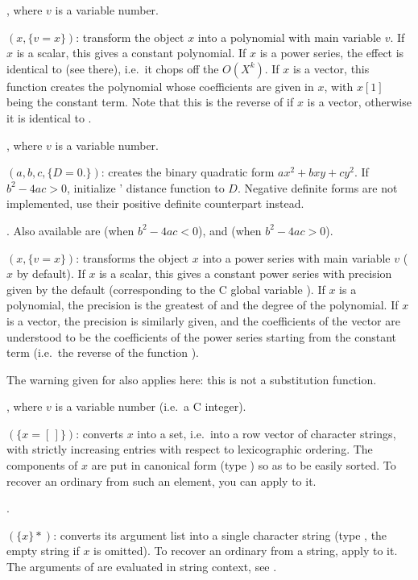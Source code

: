 , where $v$ is a variable number.

$(x,\{v=x\})$: transform the object $x$ into a polynomial
with main variable $v$. If $x$ is a scalar, this gives a constant polynomial.
If $x$ is a power series, the effect is identical to  (see
there), i.e.~it chops off the $O(X^k)$. If $x$ is a vector, this function
creates the polynomial whose coefficients are given in $x$, with $x[1]$ being
the constant term. Note that this is the reverse of  if $x$ is a
vector, otherwise it is identical to .

, where $v$ is a variable number.

$(a,b,c,\{D=0.\})$: creates the binary quadratic form
$ax^2+bxy+cy^2$. If $b^2-4ac>0$, initialize ' distance
function to $D$. Negative definite forms are not implemented,
use their positive definite counterpart instead.

. Also available are
 (when $b^2-4ac<0$), and
 (when $b^2-4ac>0$).

$(x,\{v=x\})$: transforms the object $x$ into a power series
with main variable $v$ ($x$ by default). If $x$ is a scalar, this gives a
constant power series with precision given by the default 
(corresponding to the C global variable ). If $x$ is a
polynomial, the precision is the greatest of  and the degree of
the polynomial. If $x$ is a vector, the precision is similarly given, and the
coefficients of the vector are understood to be the coefficients of the power
series starting from the constant term (i.e.~the reverse of the function
).

The warning given for  also applies here: this is not a substitution
function.

, where $v$ is a variable number (i.e.~a C integer).

$(\{x=[\,]\})$: converts $x$ into a set, i.e.~into a row
vector of character strings, with strictly increasing entries with respect to
lexicographic ordering. The components of $x$ are put in canonical form (type
) so as to be easily sorted. To recover an ordinary  from
such an element, you can apply  to it.

.

$(\{x\}*)$: converts its argument list into a
single character string (type , the empty string if $x$ is omitted).
To recover an ordinary  from a string, apply  to it. The
arguments of  are evaluated in string context, see .

